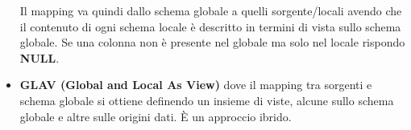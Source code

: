 \begin{itemize}
  Il mapping va quindi dallo schema globale a quelli sorgente/locali avendo che il contenuto di ogni schema locale è descritto in termini di vista sullo schema globale. Se una colonna non è presente nel globale ma solo nel locale rispondo \textbf{NULL}. 
  \item \textbf{GLAV (Global and Local As View)} dove il mapping tra sorgenti e schema globale si ottiene definendo un insieme di viste, alcune sullo schema globale e altre sulle origini dati. È un approccio ibrido.
\end{itemize}

